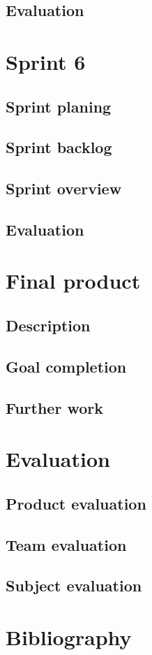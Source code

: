 \documentclass[11pt,a4paper,titlepage,oneside]{report}
\begin{document}
\section{Evaluation}

\chapter{Sprint 6}
\section{Sprint planing}
\section{Sprint backlog}
\section{Sprint overview}
\section{Evaluation}

\chapter{Final product}
\section{Description}
\section{Goal completion}
\section{Further work}

\chapter{Evaluation}
\section{Product evaluation}
\section{Team evaluation}
\section{Subject evaluation}



\chapter{Bibliography}
\begin{flushleft}
	
\end{flushleft}

\appendix
\end{document}
